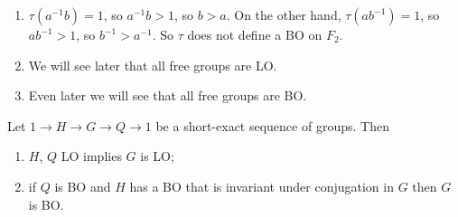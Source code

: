 \begin{rmk}
\begin{enumerate}
\item $\tau\left(a^{-1} b\right) = 1$, so $a^{-1}b > 1$, so $b > a$. On the other hand,
$\tau\left(ab^{-1}\right) = 1$, so $ab^{-1} > 1$, so $b^{-1} > a^{-1}$.
So $\tau$ does not define a BO on $F_2$.

\item We will see later that all free groups are LO.

\item Even later we will see that all free groups are BO.
\end{enumerate}
\end{rmk}

\begin{thm}
Let $1\to H\to G\to Q\to 1$ be a short-exact sequence of groups. Then
\begin{enumerate}
\item $H$, $Q$ LO implies $G$ is LO;
\item if $Q$ is BO and $H$ has a BO that is invariant under conjugation in $G$ then $G$
is BO.
\end{enumerate}
\label{thm:1.13}
\end{thm}
